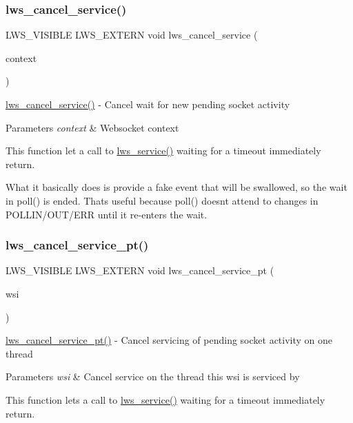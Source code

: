 \subsubsection{\texorpdfstring{lws\+\_\+cancel\+\_\+service()}{lws\_cancel\_service()}}
{\footnotesize\ttfamily L\+W\+S\+\_\+\+V\+I\+S\+I\+B\+LE L\+W\+S\+\_\+\+E\+X\+T\+E\+RN void lws\+\_\+cancel\+\_\+service (\begin{DoxyParamCaption}\item[{struct \hyperlink{structlws__context}{lws\+\_\+context} $\ast$}]{context }\end{DoxyParamCaption})}

\hyperlink{group__service_ga53e3d0801dfda7960a7249dd559e68a2}{lws\+\_\+cancel\+\_\+service()} -\/ Cancel wait for new pending socket activity 
\begin{DoxyParams}{Parameters}
{\em context} & Websocket context\\
\hline
\end{DoxyParams}
This function let a call to \hyperlink{group__service_gaf95bd0c663d6516a0c80047d9b1167a8}{lws\+\_\+service()} waiting for a timeout immediately return.

What it basically does is provide a fake event that will be swallowed, so the wait in poll() is ended. That\textquotesingle{}s useful because poll() doesn\textquotesingle{}t attend to changes in P\+O\+L\+L\+I\+N/\+O\+U\+T/\+E\+RR until it re-\/enters the wait. \mbox{\label{group__service_ga29c246707997ab7a466aa709aecd2d7b}} 
\subsubsection{\texorpdfstring{lws\+\_\+cancel\+\_\+service\+\_\+pt()}{lws\_cancel\_service\_pt()}}
{\footnotesize\ttfamily L\+W\+S\+\_\+\+V\+I\+S\+I\+B\+LE L\+W\+S\+\_\+\+E\+X\+T\+E\+RN void lws\+\_\+cancel\+\_\+service\+\_\+pt (\begin{DoxyParamCaption}\item[{struct \hyperlink{structlws}{lws} $\ast$}]{wsi }\end{DoxyParamCaption})}

\hyperlink{group__service_ga29c246707997ab7a466aa709aecd2d7b}{lws\+\_\+cancel\+\_\+service\+\_\+pt()} -\/ Cancel servicing of pending socket activity on one thread 
\begin{DoxyParams}{Parameters}
{\em wsi} & Cancel service on the thread this wsi is serviced by\\
\hline
\end{DoxyParams}
This function lets a call to \hyperlink{group__service_gaf95bd0c663d6516a0c80047d9b1167a8}{lws\+\_\+service()} waiting for a timeout immediately return.

